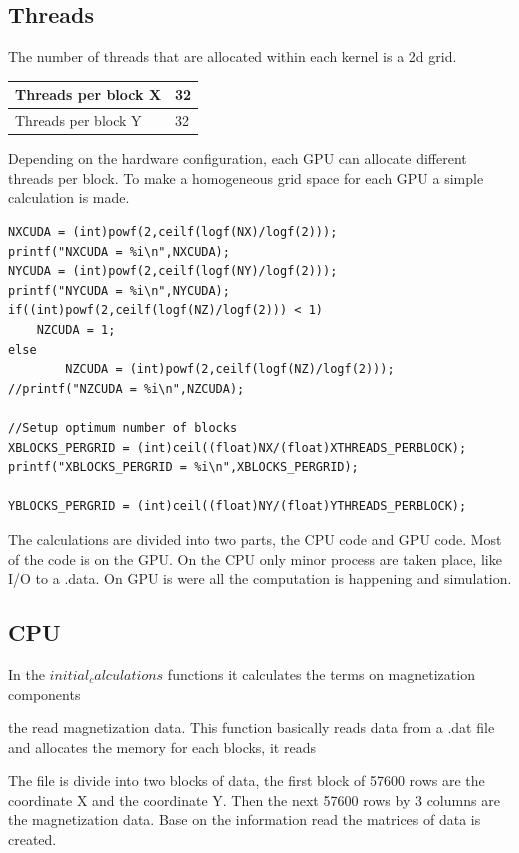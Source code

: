 \subsection{Threads}

The number of threads that are allocated within each kernel is a 2d grid.

\begin{table}[h]
\centering
\begin{tabular}{| l | l |}
\hline   
Threads per block  X   & 32       \\
\hline   
Threads per block Y     & 32         \\
\hline
\end{tabular}
\end{table}

Depending on the hardware configuration, each GPU can allocate different threads per block. To make a homogeneous grid space for each GPU a simple calculation is made.

\begin{lstlisting}[frame=none]
NXCUDA = (int)powf(2,ceilf(logf(NX)/logf(2)));
printf("NXCUDA = %i\n",NXCUDA);
NYCUDA = (int)powf(2,ceilf(logf(NY)/logf(2)));
printf("NYCUDA = %i\n",NYCUDA);
if((int)powf(2,ceilf(logf(NZ)/logf(2))) < 1)
	NZCUDA = 1;
else
        NZCUDA = (int)powf(2,ceilf(logf(NZ)/logf(2)));
//printf("NZCUDA = %i\n",NZCUDA);

//Setup optimum number of blocks
XBLOCKS_PERGRID = (int)ceil((float)NX/(float)XTHREADS_PERBLOCK); 
printf("XBLOCKS_PERGRID = %i\n",XBLOCKS_PERGRID);

YBLOCKS_PERGRID = (int)ceil((float)NY/(float)YTHREADS_PERBLOCK); 
\end{lstlisting}


The calculations are divided into two parts, the CPU code and GPU code. Most of the code is on the GPU. On the CPU only minor  process are taken place, like I/O to a .data.
On GPU is were all the computation is happening and simulation.

\subsection{CPU}
In the $initial_calculations$ functions it calculates the terms on magnetization components


the read magnetization data.
This function basically reads data from a .dat file and allocates the memory for each blocks, it reads

The file is divide into two blocks of data, the first block of 57600 rows are the coordinate X and the coordinate Y. Then the next 57600 rows by 3 columns are the magnetization data. Base on the information read the matrices of data is created.

